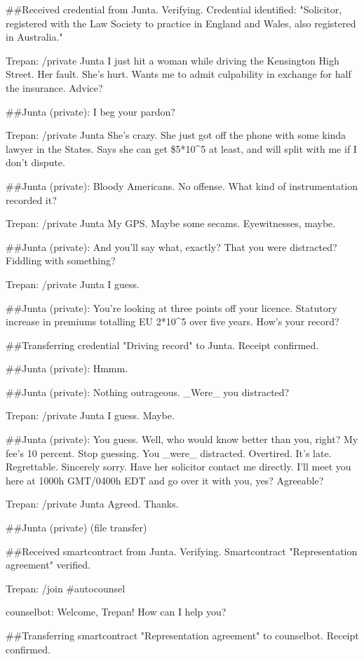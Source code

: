 {\#\#Received credential from Junta. Verifying. Credential
identified: "Solicitor, registered with the Law Society to practice
in England and Wales, also registered in Australia."

Trepan: /private Junta I just hit a woman while driving the
Kensington High Street. Her fault. She's hurt. Wants me to admit
culpability in exchange for half the insurance. Advice?

\#\#Junta (private): I beg your pardon?

Trepan: /private Junta She's crazy. She just got off the phone with
some kinda lawyer in the States. Says she can get \$5*10\^{}5 at
least, and will split with me if I don't dispute.

\#\#Junta (private): Bloody Americans. No offense. What kind of
instrumentation recorded it?

Trepan: /private Junta My GPS. Maybe some secams. Eyewitnesses,
maybe.

\#\#Junta (private): And you'll say what, exactly? That you were
distracted? Fiddling with something?

Trepan: /private Junta I guess.

\#\#Junta (private): You're looking at three points off your
licence. Statutory increase in premiums totalling EU 2*10\^{}5 over
five years. How's your record?

\#\#Transferring credential "Driving record" to Junta. Receipt
confirmed.

\#\#Junta (private): Hmmm.

\#\#Junta (private): Nothing outrageous. \_Were\_ you distracted?

Trepan: /private Junta I guess. Maybe.

\#\#Junta (private): You guess. Well, who would know better than
you, right? My fee's 10 percent. Stop guessing. You \_were\_
distracted. Overtired. It's late. Regrettable. Sincerely sorry.
Have her solicitor contact me directly. I'll meet you here at 1000h
GMT/0400h EDT and go over it with you, yes? Agreeable?

Trepan: /private Junta Agreed. Thanks.

\#\#Junta (private) (file transfer)

\#\#Received smartcontract from Junta. Verifying. Smartcontract
"Representation agreement" verified.

Trepan: /join \#autocounsel

counselbot: Welcome, Trepan! How can I help you?

\#\#Transferring smartcontract "Representation agreement" to
counselbot. Receipt confirmed.

}
